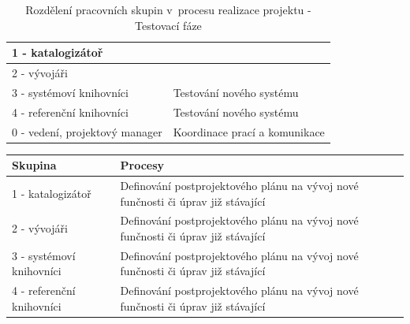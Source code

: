 \documentclass[
	11pt, oneside, printed, final, palatino, monochrome
	microtype,
	table,   %
	lof,     %
	lot     %
]{fithesis3}
\newcommand{\bold}[1]{\textbf{#1}}
\begin{document}
{\begin{table}
\begin{tabular}{| p{3cm} | p{8.3cm} |}
	1 - katalogizátoř
    & 

    \\ \hline
    
	2 - vývojáři
    & 

    \\ \hline
    
	3 - systémoví knihovníci
    & 
    Testování nového systému
    \\ \hline
    
	4 - referenční knihovníci
    & 
    Testování nového systému
    \\ \hline
    
	0 - vedení, projektový manager
    & 
    Koordinace prací a komunikace
    \\ \hline
    
    \end{tabular}
    \caption{Rozdělení pracovních skupin v~procesu realizace projektu - Testovací fáze}
\end{table}

\begin{table}
    \centering
    \begin{tabular}{| p{3cm} | p{8.3cm} |}
    \hline
    \bold{Skupina} 	
    & 
    \bold{Procesy} 
    \\ \hline
    
	1 - katalogizátoř
    & 
	Definování postprojektového plánu na vývoj nové funčnosti či úprav již stávající
    \\ \hline
    
	2 - vývojáři
    & 
	Definování postprojektového plánu na vývoj nové funčnosti či úprav již stávající
    \\ \hline
    
	3 - systémoví knihovníci
    & 
    Definování postprojektového plánu na vývoj nové funčnosti či úprav již stávající
    \\ \hline
    
	4 - referenční knihovníci
    & 
    Definování postprojektového plánu na vývoj nové funčnosti či úprav již stávající
    \\ \hline
    

\end{tabular}
\end{table}}
\end{document}
